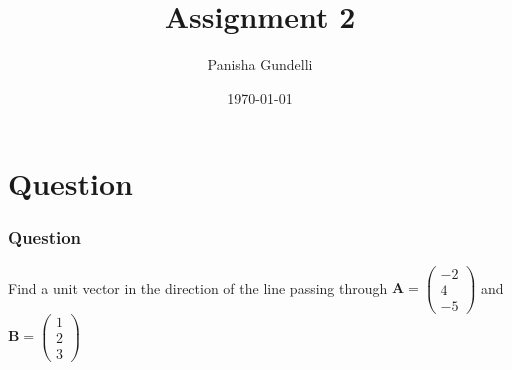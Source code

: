 \documentclass{beamer}
\title{Assignment 2}
\author{Panisha Gundelli}
\institute{NIPER Hyderabad}
\date{\today}
\renewcommand{\vec}[1]{\mathbf{#1}}
\begin{document}
\begin{frame}
\titlepage
\end{frame}
\section{Question}
\begin{frame}
\frametitle{Question}
Find a unit vector in the direction of the line passing through
\newline
$\vec {A}=\begin{pmatrix}-2\\4\\-5\end{pmatrix}$ and
$\vec {B}=\begin{pmatrix}1\\2\\3\end{pmatrix}$
\end{frame}
\end{document}
